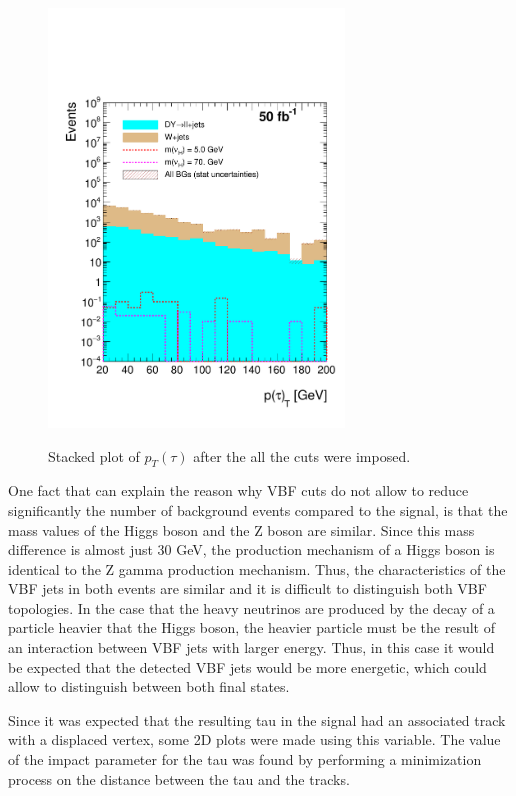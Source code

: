   \begin{figure}[h] 
 \centering
 \caption{Stacked plot of $p_T(\tau)$ after the all the cuts were imposed.}
 \includegraphics[width=0.7\textwidth]{./Capitulos/Analysis/AfterVBFCUTS/TauPt_MET20} 
 \label{taupt_VBF}
 \end{figure}  

One fact that can explain the reason why VBF cuts do not allow to reduce significantly the number of background events compared to the signal, is that the mass values of the Higgs boson and the Z boson are similar. Since this mass difference is almost just 30 GeV, the production mechanism of a Higgs boson is identical to the Z gamma production mechanism. Thus, the characteristics of the VBF jets in both events are similar and it is difficult to distinguish both VBF topologies. In the case that the heavy neutrinos are produced by the decay of a particle heavier that the Higgs boson, the heavier particle must be the result of an interaction between VBF jets with larger energy. Thus, in this case it would be expected that the detected VBF jets would be more energetic, which could allow to distinguish between both final states.

Since it was expected that the resulting tau in the signal had an associated track with a displaced vertex, some 2D plots were made using this variable. The value of the impact parameter for the tau was found by performing a minimization process on the distance between the tau and the tracks. 

